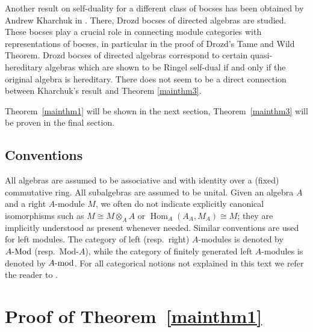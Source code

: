 \documentclass[12pt,a4paper]{amsart}
\theoremstyle{plain}
\theoremstyle{definition}
\numberwithin{equation}{thm}
\DeclareMathOperator{\Hom}{Hom}
\newcommand{\Mod}[1]{#1\hbox{-}\mathrm{Mod}}
\newcommand{\modu}[1]{#1\hbox{-}\mathrm{mod}}
\begin{document}
Another result on self-duality for a different class of bocses has been
obtained by Andrew Kharchuk in \cite{Kha03}. There, Drozd bocses of
directed algebras are studied. These bocses play a crucial role in connecting
module categories with representations of bocses, in particular in the proof of
Drozd's Tame and Wild Theorem. Drozd bocses of directed algebras correspond to
certain quasi-hereditary algebras which are shown to be Ringel self-dual
if and only if the
original algebra is hereditary. There does not seem to be a direct connection
between Kharchuk's result and Theorem \ref{mainthm3}.

\bigskip

Theorem~\ref{mainthm1} will be shown in the next section, Theorem~\ref{mainthm3} will
be proven in the final section.

\subsection*{Conventions}  All algebras are assumed to be associative and with identity over a (fixed) commutative ring. All subalgebras are assumed to be unital. Given an algebra $A$ and a right $A$-module $M$, we often do not indicate explicitly canonical isomorphisms such as $M\cong M\otimes_AA$ or $\Hom_A(A_A,M_A)\cong M$; they are implicitly understood as present whenever needed. Similar conventions are used for left modules. The category of left (resp.\ right) $A$-modules is denoted by $\Mod{A}$ (resp.\ $\mathrm{Mod}$-$A$), while the category of finitely generated left $A$-modules is denoted by $\modu{A}$. For all categorical notions not explained in this text we refer the reader to \cite{McL98}.

\section{Proof of Theorem~\ref{mainthm1}}\label{sec:proofA}
\end{document}
